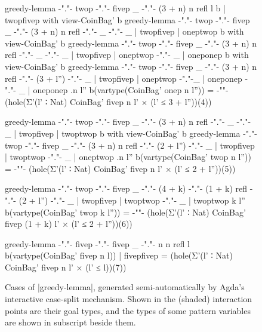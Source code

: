 \begin{figure}
\begin{code}
greedy-lemma {-"."-}  twop   {-"."-}  fivep  _    {-"."-}  (3 + n)          n        refl           l                   b  | twopfivep  with view-CoinBag' b
greedy-lemma {-"."-}  twop   {-"."-}  fivep  _    {-"."-}  (3 + n)          n        refl  {-"."-}  _          {-"."-}  _  | twopfivep  | oneptwop          b  with view-CoinBag' b
greedy-lemma {-"."-}  twop   {-"."-}  fivep  _    {-"."-}  (3 + n)          n        refl  {-"."-}  _          {-"."-}  _  | twopfivep  | oneptwop {-"."-}  _  | oneponep        b  with view-CoinBag' b
greedy-lemma {-"."-}  twop   {-"."-}  fivep  _    {-"."-}  (3 + n)          n        refl  {-"."-}  (3 + l'')  {-"."-}  _  | twopfivep  | oneptwop {-"."-}_  | oneponep {-"."-}  _  | oneponep {.n} {l''} b(vartype(CoinBag' onep n l'')) =
{-"\hfill"-} (hole(Σ'(l' ∶ Nat) CoinBag' fivep n l' × (l' ≤ 3 + l''))(4))

greedy-lemma {-"."-}  twop   {-"."-}  fivep  _    {-"."-}  (3 + n)          n        refl  {-"."-}  _          {-"."-}  _  | twopfivep  | twoptwop          b  with view-CoinBag' b
greedy-lemma {-"."-}  twop   {-"."-}  fivep  _    {-"."-}  (3 + n)          n        refl  {-"."-}  (2 + l'')  {-"."-}  _  | twopfivep  | twoptwop {-"."-}  _  | oneptwop {.n}  {l''} b(vartype(CoinBag' twop n l'')) =
{-"\hfill"-} (hole(Σ'(l' ∶ Nat) CoinBag' fivep n l' × (l' ≤ 2 + l''))(5))

greedy-lemma {-"."-}  twop   {-"."-}  fivep  _    {-"."-}  (4 + k) {-"."-}  (1 + k)  refl  {-"."-}  (2 + l'')  {-"."-}  _  | twopfivep  | twoptwop {-"."-}  _  | twoptwop {k}   {l''} b(vartype(CoinBag' twop k l'')) =
{-"\hfill"-} (hole(Σ'(l' ∶ Nat) CoinBag' fivep (1 + k) l' × (l' ≤ 2 + l''))(6))

greedy-lemma {-"."-}  fivep  {-"."-}  fivep  _    {-"."-}  n                n        refl           l                   b(vartype(CoinBag' fivep n l))  | fivepfivep = (hole(Σ'(l' ∶ Nat) CoinBag' fivep n l' × (l' ≤ l))(7))
\end{code}
\caption{Cases of |greedy-lemma|, generated semi-automatically by Agda's interactive case-split mechanism. Shown in the (shaded) interaction points are their goal types, and the types of some pattern variables are shown in subscript beside them.}
\label{fig:greedy-lemma}
\end{figure}

